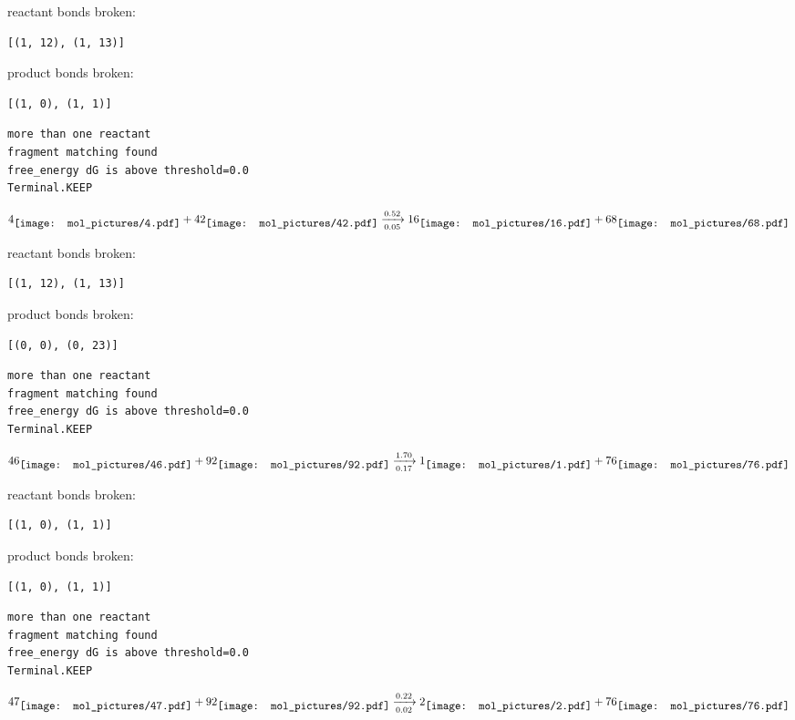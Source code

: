 \documentclass{article}
\begin{document}
reactant bonds broken:\begin{verbatim}
[(1, 12), (1, 13)]
\end{verbatim}
product bonds broken:\begin{verbatim}
[(1, 0), (1, 1)]
\end{verbatim}




\vspace{1cm}
\begin{verbatim}
more than one reactant
fragment matching found
free_energy dG is above threshold=0.0
Terminal.KEEP
\end{verbatim}
$$
4
\raisebox{-.5\height}{\texttt{[image: mol\_pictures/4.pdf]}}
+
42
\raisebox{-.5\height}{\texttt{[image: mol\_pictures/42.pdf]}}
\xrightarrow[0.05]{0.52}
16
\raisebox{-.5\height}{\texttt{[image: mol\_pictures/16.pdf]}}
+
68
\raisebox{-.5\height}{\texttt{[image: mol\_pictures/68.pdf]}}
$$


reactant bonds broken:\begin{verbatim}
[(1, 12), (1, 13)]
\end{verbatim}
product bonds broken:\begin{verbatim}
[(0, 0), (0, 23)]
\end{verbatim}




\vspace{1cm}
\begin{verbatim}
more than one reactant
fragment matching found
free_energy dG is above threshold=0.0
Terminal.KEEP
\end{verbatim}
$$
46
\raisebox{-.5\height}{\texttt{[image: mol\_pictures/46.pdf]}}
+
92
\raisebox{-.5\height}{\texttt{[image: mol\_pictures/92.pdf]}}
\xrightarrow[0.17]{1.70}
1
\raisebox{-.5\height}{\texttt{[image: mol\_pictures/1.pdf]}}
+
76
\raisebox{-.5\height}{\texttt{[image: mol\_pictures/76.pdf]}}
$$


reactant bonds broken:\begin{verbatim}
[(1, 0), (1, 1)]
\end{verbatim}
product bonds broken:\begin{verbatim}
[(1, 0), (1, 1)]
\end{verbatim}




\vspace{1cm}
\begin{verbatim}
more than one reactant
fragment matching found
free_energy dG is above threshold=0.0
Terminal.KEEP
\end{verbatim}
$$
47
\raisebox{-.5\height}{\texttt{[image: mol\_pictures/47.pdf]}}
+
92
\raisebox{-.5\height}{\texttt{[image: mol\_pictures/92.pdf]}}
\xrightarrow[0.02]{0.22}
2
\raisebox{-.5\height}{\texttt{[image: mol\_pictures/2.pdf]}}
+
76
\raisebox{-.5\height}{\texttt{[image: mol\_pictures/76.pdf]}}
$$
\end{document}
